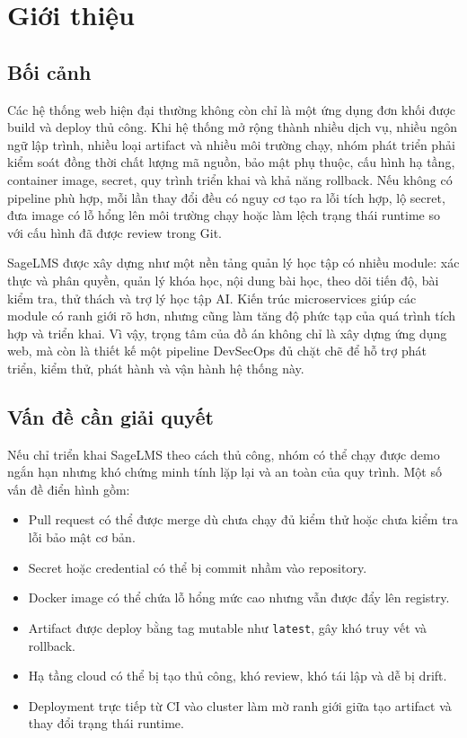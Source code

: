 \chapter{Giới thiệu}
\label{chap:introduction}

\section{Bối cảnh}

Các hệ thống web hiện đại thường không còn chỉ là một ứng dụng đơn khối được build và deploy thủ công. Khi hệ thống mở rộng thành nhiều dịch vụ, nhiều ngôn ngữ lập trình, nhiều loại artifact và nhiều môi trường chạy, nhóm phát triển phải kiểm soát đồng thời chất lượng mã nguồn, bảo mật phụ thuộc, cấu hình hạ tầng, container image, secret, quy trình triển khai và khả năng rollback. Nếu không có pipeline phù hợp, mỗi lần thay đổi đều có nguy cơ tạo ra lỗi tích hợp, lộ secret, đưa image có lỗ hổng lên môi trường chạy hoặc làm lệch trạng thái runtime so với cấu hình đã được review trong Git.

SageLMS được xây dựng như một nền tảng quản lý học tập có nhiều module: xác thực và phân quyền, quản lý khóa học, nội dung bài học, theo dõi tiến độ, bài kiểm tra, thử thách và trợ lý học tập AI. Kiến trúc microservices giúp các module có ranh giới rõ hơn, nhưng cũng làm tăng độ phức tạp của quá trình tích hợp và triển khai. Vì vậy, trọng tâm của đồ án không chỉ là xây dựng ứng dụng web, mà còn là thiết kế một pipeline DevSecOps đủ chặt chẽ để hỗ trợ phát triển, kiểm thử, phát hành và vận hành hệ thống này.

\section{Vấn đề cần giải quyết}

Nếu chỉ triển khai SageLMS theo cách thủ công, nhóm có thể chạy được demo ngắn hạn nhưng khó chứng minh tính lặp lại và an toàn của quy trình. Một số vấn đề điển hình gồm:

\begin{itemize}
  \item Pull request có thể được merge dù chưa chạy đủ kiểm thử hoặc chưa kiểm tra lỗi bảo mật cơ bản.
  \item Secret hoặc credential có thể bị commit nhầm vào repository.
  \item Docker image có thể chứa lỗ hổng mức cao nhưng vẫn được đẩy lên registry.
  \item Artifact được deploy bằng tag mutable như \texttt{latest}, gây khó truy vết và rollback.
  \item Hạ tầng cloud có thể bị tạo thủ công, khó review, khó tái lập và dễ bị drift.
  \item Deployment trực tiếp từ CI vào cluster làm mờ ranh giới giữa tạo artifact và thay đổi trạng thái runtime.
\end{itemize}

